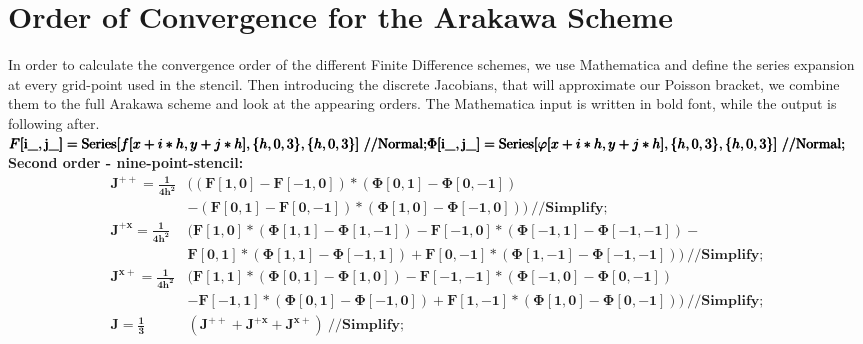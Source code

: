 

\section{Order of Convergence for the Arakawa Scheme}
\label{sec:ara_order}

In order to calculate the convergence order of the different Finite Difference schemes, we use Mathematica and define the series expansion at every grid-point used in the stencil. Then introducing the discrete Jacobians, that will approximate our Poisson bracket, we combine them to the full Arakawa scheme and look at the appearing orders. The Mathematica input is written in bold font, while the output is following after. \\ 

\noindent\(	\pmb{F[\text{i$\_$}, \text{j$\_$}] = \text{Series}[f[x+i*h,y+j*h], \{h,0, 3\}, \{h,0, 3\}] \ \text{//}\text{Normal};}\\
	\pmb{\Phi[\text{i$\_$}, \text{j$\_$}] = \text{Series}[\varphi[x+i*h,y+j*h], \{h,0, 3\}, \{h,0, 3\}] \ \text{//}\text{Normal};} \)
\textbf{Second order - nine-point-stencil:}\\
\begin{align*}
	\pmb{J^{++} = }
	\pmb{ \frac{1}{4 h^2}}
	&\pmb{( (F[1, 0] - F[-1, 0])*(\Phi[0,1]-\Phi[0,-1]) } \\
	&\pmb{- (F[0,1]-F[0,-1])*(\Phi[1,0]-\Phi[-1,0])) \ \text{//}\text{Simplify}};\\
%
	\pmb{J^{+x} = }
	\pmb{ \frac{1}{4 h^2}}
	&\pmb{( F[1,0]*(\Phi[1,1] - \Phi[1,-1])-F[-1, 0]*(\Phi[-1, 1]- \Phi[-1, -1]) - }\\
	&\pmb{F[0, 1]*(\Phi[1, 1] - \Phi[-1, 1]) + }
	\pmb{F[0, -1]*(\Phi[1, -1]-\Phi[-1,-1])) \ \text{//}\text{Simplify}}; \\
%
	\pmb{J^{x+} = }
	\pmb{ \frac{1}{4 h^2}}
	&\pmb{(F[1,1]*(\Phi[0,1]-\Phi[1,0])-F[-1,-1]*(\Phi[-1,0]-\Phi[0,-1]) }\\
	&-\pmb{F[-1,1]*(\Phi[0,1]-\Phi[-1,0])+F[1,-1]*(\Phi[1,0]-\Phi[0,-1])) \ \text{//}} \pmb{\text{Simplify}};\\
%
	\pmb{ J = \frac{1}{3}} & \pmb{(J^{++} + J^{+x} + J^{x+}) \ \text{//}\text{Simplify}};
\end{align*}

